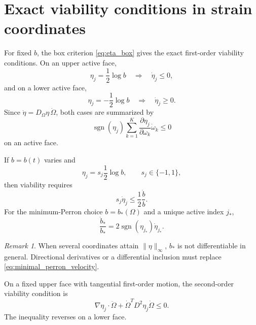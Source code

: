 \documentclass[11pt]{amsart}
\numberwithin{equation}{section}
\theoremstyle{plain}
\theoremstyle{definition}
\theoremstyle{remark}
\newtheorem{remark}[theorem]{Remark}
\begin{document}
\section{Exact viability conditions in strain coordinates}
\label{sec:eta_viability}

For fixed $b$, the box criterion \eqref{eq:eta_box} gives the exact first-order viability conditions.  On an upper active face,
\begin{equation}
\eta_j=\frac12\log b
\quad\Longrightarrow\quad
\dot\eta_j\leq0,
\label{eq:upper_face_velocity}
\end{equation}
and on a lower active face,
\begin{equation}
\eta_j=-\frac12\log b
\quad\Longrightarrow\quad
\dot\eta_j\geq0.
\label{eq:lower_face_velocity}
\end{equation}
Since $\dot\eta=D_\Omega\eta\,\dot\Omega$, both cases are summarized by
\begin{equation}
\operatorname{sgn}(\eta_j)
\sum_{k=1}^{K}
\frac{\partial\eta_j}{\partial\omega_k}
\dot\omega_k
\leq0
\label{eq:phase_velocity_face_condition}
\end{equation}
on an active face.

If $b=b(t)$ varies and
\begin{equation}
\eta_j=s_j\frac12\log b,
\qquad s_j\in\{-1,1\},
\label{eq:moving_active_face}
\end{equation}
then viability requires
\begin{equation}
s_j\dot\eta_j
\leq\frac12\frac{\dot b}{b}.
\label{eq:moving_face_velocity}
\end{equation}
For the minimum-Perron choice $b=b_*(\Omega)$ and a unique active index $j_*$,
\begin{equation}
\frac{\dot b_*}{b_*}
=2\operatorname{sgn}(\eta_{j_*})\dot\eta_{j_*}.
\label{eq:minimal_perron_velocity}
\end{equation}

\begin{remark}
\label{rem:tied_active_indices}
When several coordinates attain $\|\eta\|_\infty$, $b_*$ is not differentiable in general.  Directional derivatives or a differential inclusion must replace \eqref{eq:minimal_perron_velocity}.
\end{remark}

On a fixed upper face with tangential first-order motion, the second-order viability condition is
\begin{equation}
\nabla\eta_j\cdot\ddot\Omega
+
\dot\Omega^TD^2\eta_j\dot\Omega
\leq0.
\label{eq:upper_face_acceleration}
\end{equation}
The inequality reverses on a lower face.
\end{document}
